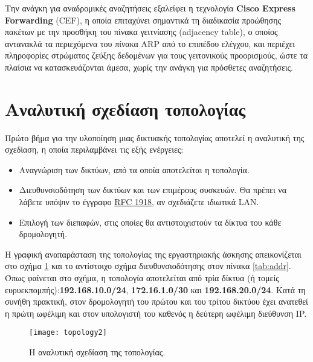 \documentclass{EdipyLabs} %
\begin{document}
Την ανάγκη για αναδρομικές αναζητήσεις εξαλείφει η τεχνολογία \textbf{Cisco Express Forwarding} (CEF), η οποία επιταχύνει σημαντικά τη διαδικασία προώθησης πακέτων με την προσθήκη του πίνακα γειτνίασης (adjacency table), ο οποίος αντανακλά τα περιεχόμενα του πίνακα ARP από το επιπέδου ελέγχου, και περιέχει πληροφορίες στρώματος ζεύξης δεδομένων για τους γειτονικούς προορισμούς, ώστε τα πλαίσια να κατασκευάζονται άμεσα, χωρίς την ανάγκη για πρόσθετες αναζητήσεις.

\newpage

\section{Αναλυτική σχεδίαση τοπολογίας}
Πρώτο βήμα για την υλοποίηση μιας δικτυακής τοπολογίας αποτελεί η αναλυτική της σχεδίαση, η οποία περιλαμβάνει τις εξής ενέργειες:
\begin{itemize}
	\item Αναγνώριση των δικτύων, από τα οποία αποτελείται η τοπολογία.
	\item Διευθυνσιοδότηση των δικτύων και των επιμέρους συσκευών. Θα πρέπει να λάβετε υπόψιν το έγγραφο \href{https://tools.ietf.org/html/rfc1918}{RFC 1918}, αν σχεδιάζετε ιδιωτικά LAN.
	\item Επιλογή των διεπαφών, στις οποίες θα αντιστοιχιστούν τα δίκτυα του κάθε δρομολογητή.
\end{itemize}

Η γραφική αναπαράσταση της τοπολογίας της εργαστηριακής άσκησης απεικονίζεται στο σχήμα \ref{topology2} και το αντίστοιχο σχήμα διευθυνσιοδότησης στον πίνακα \ref{tab:addr}. Όπως φαίνεται στο σχήμα, η τοπολογία αποτελείται από τρία δίκτυα (ή τομείς ευρυεκπομπής):\textbf{192.168.10.0/24}, \textbf{172.16.1.0/30} και \textbf{192.168.20.0/24}. Κατά τη συνήθη πρακτική, στον δρομολογητή του πρώτου και του τρίτου δικτύου έχει ανατεθεί η πρώτη ωφέλιμη και στον υπολογιστή του καθενός η δεύτερη ωφέλιμη διεύθυνση IP.

\begin{figure}[ht]
	\texttt{[image: topology2]}
	\caption{Η αναλυτική σχεδίαση της τοπολογίας.}\label{topology2}
\end{figure}
\end{document}
